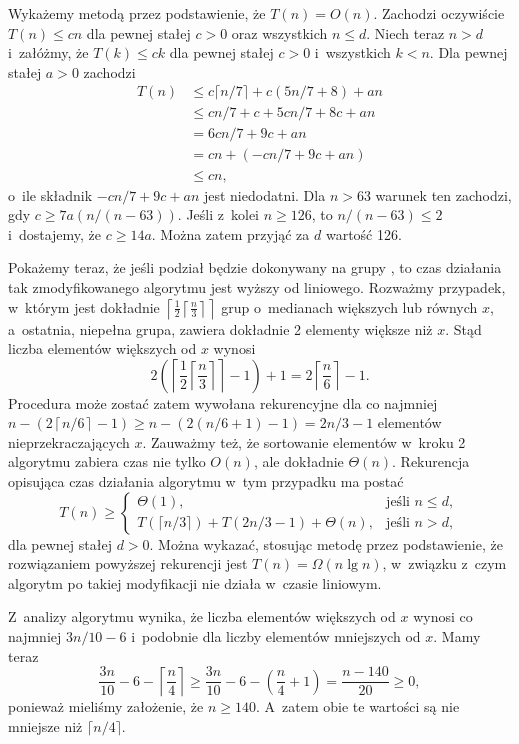 Wykażemy metodą przez podstawienie, że $T(n)=O(n)$. Zachodzi oczywiście $T(n)\le cn$ dla pewnej stałej $c>0$ oraz wszystkich $n\le d$. Niech teraz $n>d$ i~załóżmy, że $T(k)\le ck$ dla pewnej stałej $c>0$ i~wszystkich $k<n$. Dla pewnej stałej $a>0$ zachodzi
\begin{align*}
	T(n) &\le c\lceil n/7\rceil+c(5n/7+8)+an \\
	&\le cn/7+c+5cn/7+8c+an \\
	&= 6cn/7+9c+an \\
	&= cn+(-cn/7+9c+an) \\
	&\le cn,
\end{align*}
o~ile składnik $-cn/7+9c+an$ jest niedodatni. Dla $n>63$ warunek ten zachodzi, gdy $c\ge7a(n/(n-63))$. Jeśli z~kolei $n\ge126$, to $n/(n-63)\le2$ i~dostajemy, że $c\ge14a$. Można zatem przyjąć za $d$ wartość 126.

Pokażemy teraz, że jeśli podział będzie dokonywany na grupy , to czas działania tak zmodyfikowanego algorytmu  jest wyższy od liniowego. Rozważmy przypadek, w~którym jest dokładnie $\left\lceil\frac{1}{2}\left\lceil\frac{n}{3}\right\rceil\right\rceil$ grup o~medianach większych lub równych $x$, a~ostatnia, niepełna grupa, zawiera dokładnie 2 elementy większe niż $x$. Stąd liczba elementów większych od $x$ wynosi
\[
	2\left(\left\lceil\frac{1}{2}\left\lceil\frac{n}{3}\right\rceil\right\rceil-1\right)+1 = 2\left\lceil\frac{n}{6}\right\rceil-1.
\]
Procedura może zostać zatem wywołana rekurencyjne dla co najmniej $n-(2\left\lceil n/6\right\rceil-1)\ge n-(2(n/6+1)-1)=2n/3-1$ elementów nieprzekraczających $x$. Zauważmy też, że sortowanie elementów w~kroku 2 algorytmu  zabiera czas nie tylko $O(n)$, ale dokładnie $\Theta(n)$. Rekurencja opisująca czas działania algorytmu w~tym przypadku ma postać
\[
	T(n) \ge \begin{cases}
		\Theta(1), & \text{jeśli $n\le d$}, \\
		T(\lceil n/3\rceil)+T(2n/3-1)+\Theta(n), & \text{jeśli $n>d$},
	\end{cases}
\]
dla pewnej stałej $d>0$. Można wykazać, stosując metodę przez podstawienie, że rozwiązaniem powyższej rekurencji jest $T(n)=\Omega(n\lg n)$, w~związku z~czym algorytm po takiej modyfikacji nie działa w~czasie liniowym.

\exercise %
Z~analizy algorytmu  wynika, że liczba elementów większych od $x$ wynosi co najmniej $3n/10-6$ i~podobnie dla liczby elementów mniejszych od $x$. Mamy teraz
\[
	\frac{3n}{10}-6-\left\lceil\frac{n}{4}\right\rceil \ge \frac{3n}{10}-6-\left(\frac{n}{4}+1\right) = \frac{n-140}{20} \ge 0,
\]
ponieważ mieliśmy założenie, że $n\ge140$. A~zatem obie te wartości są nie mniejsze niż $\lceil n/4\rceil$.

